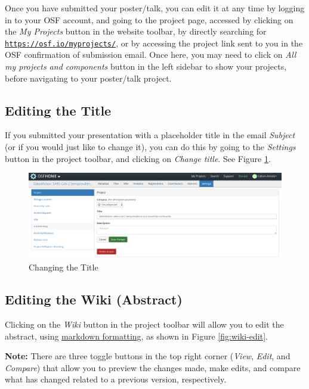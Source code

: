 \documentclass{scrartcl}
\begin{document}
Once you have submitted your poster/talk, you can edit it at any time by logging in to your OSF account, and going to the project page, accessed by clicking on the \emph{My Projects} button in the website toolbar, by directly searching for \href{https://osf.io/myprojects/}{\texttt{https://osf.io/myprojects/}}, or by accessing the project link sent to you in the OSF confirmation of submission email.
Once here, you may need to click on \emph{All my projects and components} button in the left sidebar to show your projects, before navigating to your poster/talk project.

\subsection{Editing the Title}

If you submitted your presentation with a placeholder title in the email \emph{Subject} (or if you would just like to change it), you can do this by going to the \emph{Settings} button in the project toolbar, and clicking on \emph{Change title}. See Figure \ref{fig:title-edit}.

\begin{figure}[!htb]
    \includegraphics[width=\textwidth]{title-edit.png}
    \caption{Changing the Title}
    \label{fig:title-edit}
\end{figure}

\subsection{Editing the Wiki (Abstract)}

Clicking on the \emph{Wiki} button in the project toolbar will allow you to edit the abstract, using \href{https://www.markdownguide.org/basic-syntax/}{markdown formatting}, as shown in Figure \ref{fig:wiki-edit}.

\begin{displayquote}
    \textbf{Note:} There are three toggle buttons in the top right corner (\emph{View}, \emph{Edit}, and \emph{Compare}) that allow you to preview the changes made, make edits, and compare what has changed related to a previous version, respectively.
\end{displayquote}
\end{document}
